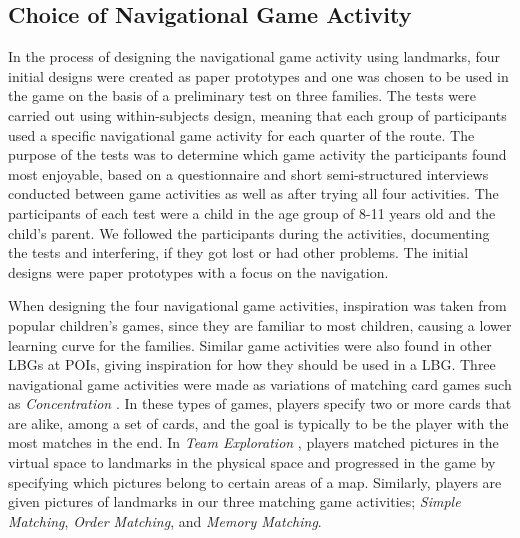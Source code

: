 \subsection{Choice of Navigational Game Activity}
In the process of designing the navigational game activity using landmarks, four initial designs were created as paper prototypes and one was chosen to be used in the game on the basis of a preliminary test on three families. The tests were carried out using within-subjects design, meaning that each group of participants used a specific navigational game activity for each quarter of the route. The purpose of the tests was to determine which game activity the participants found most enjoyable, based on a questionnaire and short semi-structured interviews conducted between game activities as well as after trying all four activities. The participants of each test were a child in the age group of 8-11 years old and the child's parent. We followed the participants during the activities, documenting the tests and interfering, if they got lost or had other problems. The initial designs were paper prototypes with a focus on the navigation. %

When designing the four navigational game activities, inspiration was taken from popular children's games, since they are familiar to most children, causing a lower learning curve for the families. Similar game activities were also found in other LBGs at POIs, giving inspiration for how they should be used in a LBG. Three navigational game activities were made as variations of matching card games such as \textit{Concentration} \cite{childrensGames}. In these types of games, players specify two or more cards that are alike, among a set of cards, and the goal is typically to be the player with the most matches in the end. In \textit{Team Exploration} \cite{GamingOnTheMove}, players matched pictures in the virtual space to landmarks in the physical space and progressed in the game by specifying which pictures belong to certain areas of a map. Similarly, players are given pictures of landmarks in our three matching game activities; \textit{Simple Matching}, \textit{Order Matching}, and \textit{Memory Matching}.

